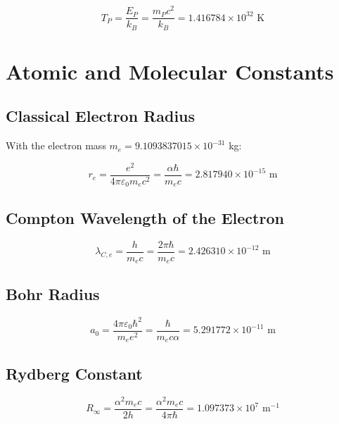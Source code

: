 	\begin{equation}
		T_P = \frac{E_P}{k_B} = \frac{m_P c^2}{k_B} = 1.416784 \times 10^{32} \text{ K}
	\end{equation}
	
	\section{Atomic and Molecular Constants}
	
	\subsection{Classical Electron Radius}
	
	With the electron mass $m_e = 9.1093837015 \times 10^{-31}$ kg:
	
	\begin{equation}
		r_e = \frac{e^2}{4\pi\varepsilon_0 m_e c^2} = \frac{\alpha \hbar}{m_e c} = 2.817940 \times 10^{-15} \text{ m}
	\end{equation}
	
	\subsection{Compton Wavelength of the Electron}
	
	\begin{equation}
		\lambda_{C,e} = \frac{h}{m_e c} = \frac{2\pi\hbar}{m_e c} = 2.426310 \times 10^{-12} \text{ m}
	\end{equation}
	
	\subsection{Bohr Radius}
	
	\begin{equation}
		a_0 = \frac{4\pi\varepsilon_0\hbar^2}{m_e e^2} = \frac{\hbar}{m_e c \alpha} = 5.291772 \times 10^{-11} \text{ m}
	\end{equation}
	
	\subsection{Rydberg Constant}
	
	\begin{equation}
		R_\infty = \frac{\alpha^2 m_e c}{2h} = \frac{\alpha^2 m_e c}{4\pi\hbar} = 1.097373 \times 10^7 \text{ m}^{-1}
	\end{equation}
	
